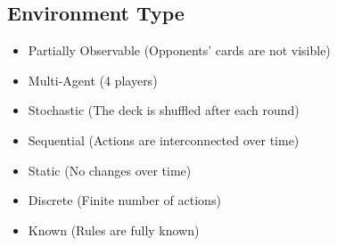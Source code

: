 \subsection{Environment Type}
\begin{itemize}
    \item Partially Observable (Opponents' cards are not visible)
    \item Multi-Agent (4 players)
    \item Stochastic (The deck is shuffled after each round)
    \item Sequential (Actions are interconnected over time)
    \item Static (No changes over time)
    \item Discrete (Finite number of actions)
    \item Known (Rules are fully known)
\end{itemize}